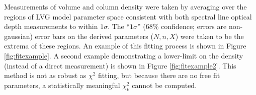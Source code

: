 
%

%

Measurements of volume and column density were taken by averaging over the regions of
LVG model parameter space consistent with both spectral line optical depth measurements
to within $1\sigma$.  The ``$1\sigma$'' (68\% confidence; errors are
non-gaussian) error bars on the derived parameters ($N,n,X$) were taken to be
the extrema of these regions.  An example of this fitting process is shown in
Figure \ref{fig:fitexample}.  A second example demonstrating a lower-limit on the density
(instead of a direct measurement) is shown in Figure \ref{fig:fitexample2}.  This method is not as robust as $\chi^2$ fitting,
but because there are no free fit parameters, a statistically meaningful
$\chi^2_\nu$ cannot be computed.

